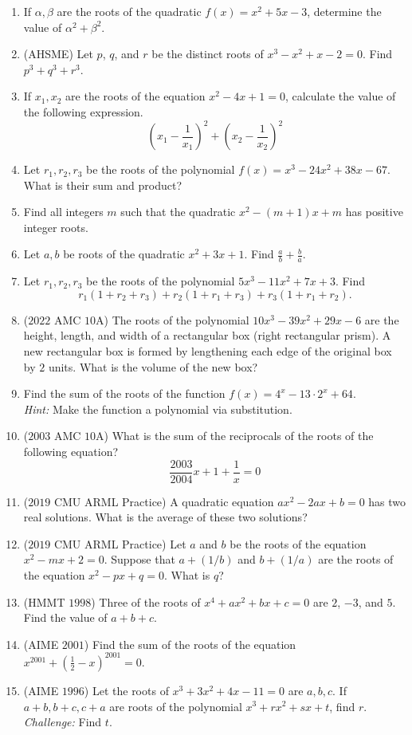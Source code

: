 \documentclass{tufte-handout}
\begin{document}
\begin{enumerate}
    \item If $\alpha, \beta$ are the roots of the quadratic $f(x)=x^2+5x-3$, determine the value of $\alpha^2+\beta^2$.
    \item (AHSME) Let $p$, $q$, and $r$ be the distinct roots of $x^3 - x^2 + x - 2 = 0$. Find $p^3 + q^3 + r^3$.
    \item If $x_1, x_2$ are the roots of the equation $x^2-4x+1=0$, calculate the value of the following expression.
    \[\left(x_1-\dfrac1{x_1}\right)^2+\left(x_2-\dfrac1{x_2}\right)^2\]
    \item Let $r_1,r_2,r_3$ be the roots of the polynomial $f(x)=x^3-24x^2+38x-67$. What is their sum and product?
    \item Find all integers \(m\) such that the quadratic $x^2-(m+1)x+m$ has positive integer roots.
    \item Let $a,b$ be roots of the quadratic $x^2+3x+1$. Find $\frac ab + \frac ba$.
    \item Let $r_1,r_2,r_3$ be the roots of the polynomial $5x^3-11x^2+7x+3$. Find
    \[r_1(1+r_2+r_3)+r_2(1+r_1+r_3)+r_3(1+r_1+r_2).\]
    \item ($2022$ AMC $10$A) The roots of the polynomial $10x^3 - 39x^2 + 29x - 6$ are the height, length, and width of a rectangular box (right rectangular prism). A new rectangular box is formed by lengthening each edge of the original box by $2$ units. What is the volume of the new box?
    \item Find the sum of the roots of the function $f(x)=4^x-13\cdot 2^x+64$. \\
    \textit{Hint: } Make the function a polynomial via substitution.
    \item ($2003$ AMC $10$A) What is the sum of the reciprocals of the roots of the following equation? 
    \[\frac{2003}{2004}x+1+\frac{1}{x}=0\]
    \item ($2019$ CMU ARML Practice) A quadratic equation $ax^2 - 2ax + b = 0$ has two real solutions. What is the average of these two solutions?
    \item ($2019$ CMU ARML Practice) Let $a$ and $b$ be the roots of the equation $x^2 - mx + 2 = 0$. Suppose that $a + (1/b)$ and $b + (1/a)$ are the roots of the equation $x^2 - px + q = 0$. What is $q$?
    \item  (HMMT $1998$) Three of the roots of $x^4 + ax^2 + bx + c = 0$ are $2$, $-3$, and $5$. Find the value of $a + b + c$.
    \item (AIME $2001$) Find the sum of the roots of the equation $x^{2001}+(\frac12-x)^{2001}=0$.
    \item (AIME $1996$) Let the roots of $x^3+3x^2+4x-11=0$ are $a,b,c$. If $a+b,b+c,c+a$ are roots of the polynomial $x^3+rx^2+sx+t$, find $r$. \\\textit{Challenge: } Find $t$.
    
\end{enumerate}
\end{document}
